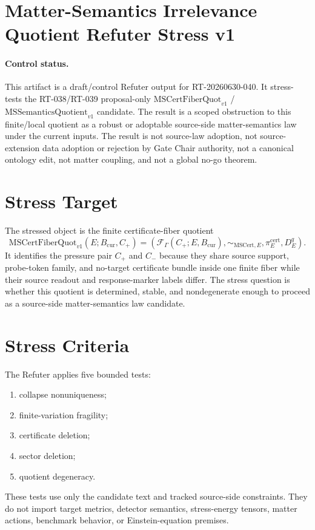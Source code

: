 \section*{Matter-Semantics Irrelevance Quotient Refuter Stress v1}

\paragraph{Control status.}
This artifact is a draft/control Refuter output for RT-20260630-040. It
stress-tests the RT-038/RT-039 proposal-only
\(\mathrm{MSCertFiberQuot}_{v1}\) / \(\mathrm{MSSemanticsQuotient}_{v1}\)
candidate. The result is a scoped obstruction to this finite/local quotient as
a robust or adoptable source-side matter-semantics law under the current
inputs. The result is not source-law adoption, not source-extension data
adoption or rejection by Gate Chair authority, not a canonical ontology edit,
not matter coupling, and not a global no-go theorem.

\newcommand{\Bcur}{B_{\mathrm{cur}}}
\newcommand{\MSAdm}{\mathrm{MSAdm}_{v1}}
\newcommand{\MSCertEq}{\sim_{\mathrm{MSCert},E}}
\newcommand{\MSCertQuot}{\mathrm{MSCertFiberQuot}_{v1}}
\newcommand{\MSQuot}{\mathrm{MSSemanticsQuotient}_{v1}}
\newcommand{\MSIrrel}{\mathrm{MSIrrelLaw}_{v1}}
\newcommand{\Ob}{\mathrm{MSQObstruction}_{v1}}

\newtheorem{definition}{Definition}
\newtheorem{proposition}{Proposition}

\section{Stress Target}

The stressed object is the finite certificate-fiber quotient
\[
  \MSCertQuot(E;\Bcur,C_+)=
  \left(\mathcal F_{\Gamma}(C_+;E,\Bcur),\MSCertEq,
  \pi^{\mathrm{cert}}_E,D^q_E\right).
\]
It identifies the pressure pair \(C_+\) and \(C_-\) because they share source
support, probe-token family, and no-target certificate bundle inside one
finite fiber while their source readout and response-marker labels differ.
The stress question is whether this quotient is determined, stable, and
nondegenerate enough to proceed as a source-side matter-semantics law
candidate.

\section{Stress Criteria}

The Refuter applies five bounded tests:
\begin{enumerate}
  \item collapse nonuniqueness;
  \item finite-variation fragility;
  \item certificate deletion;
  \item sector deletion;
  \item quotient degeneracy.
\end{enumerate}
These tests use only the candidate text and tracked source-side constraints.
They do not import target metrics, detector semantics, stress-energy tensors,
matter actions, benchmark behavior, or Einstein-equation premises.

